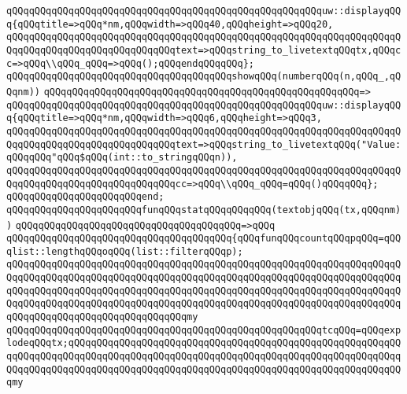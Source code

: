 \verb|qQQqqQQqqQQqqQQqqQQqqQQqqQQqqQQqqQQqqQQqqQQqqQQqqQQqqQQquw::displayqQQq{qQQqtitle=>qQQq*nm,qQQqwidth=>qQQq40,qQQqheight=>qQQq20,|\newline
\verb|qQQqqQQqqQQqqQQqqQQqqQQqqQQqqQQqqQQqqQQqqQQqqQQqqQQqqQQqqQQqqQQqqQQqqQQqqQQqqQQqqQQqqQQqqQQqqQQqqQQqtext=>qQQqstring_to_livetextqQQqtx,qQQqcc=>qQQq\\qQQq_qQQq=>qQQq();qQQqendqQQqqQQq};|\newline
\newline
\verb|qQQqqQQqqQQqqQQqqQQqqQQqqQQqqQQqqQQqqQQqshowqQQq(numberqQQq(n,qQQq_,qQQqnm))|\newline
\verb|qQQqqQQqqQQqqQQqqQQqqQQqqQQqqQQqqQQqqQQqqQQqqQQqqQQqqQQq=>|\newline
\verb|qQQqqQQqqQQqqQQqqQQqqQQqqQQqqQQqqQQqqQQqqQQqqQQqqQQqqQQquw::displayqQQq{qQQqtitle=>qQQq*nm,qQQqwidth=>qQQq6,qQQqheight=>qQQq3,|\newline
\verb|qQQqqQQqqQQqqQQqqQQqqQQqqQQqqQQqqQQqqQQqqQQqqQQqqQQqqQQqqQQqqQQqqQQqqQQqqQQqqQQqqQQqqQQqqQQqqQQqqQQqtext=>qQQqstring_to_livetextqQQq("Value:qQQqqQQq"qQQq$qQQq(int::to_stringqQQqn)),|\newline
\verb|qQQqqQQqqQQqqQQqqQQqqQQqqQQqqQQqqQQqqQQqqQQqqQQqqQQqqQQqqQQqqQQqqQQqqQQqqQQqqQQqqQQqqQQqqQQqqQQqqQQqcc=>qQQq\\qQQq_qQQq=qQQq()qQQqqQQq};|\newline
\verb|qQQqqQQqqQQqqQQqqQQqqQQqend;|\newline
\newline
\verb|qQQqqQQqqQQqqQQqqQQqqQQqfunqQQqstatqQQqqQQqqQQq(textobjqQQq(tx,qQQqnm))|\newline
\verb|qQQqqQQqqQQqqQQqqQQqqQQqqQQqqQQqqQQqqQQq=>qQQq|\newline
\verb|qQQqqQQqqQQqqQQqqQQqqQQqqQQqqQQqqQQqqQQq{qQQqfunqQQqcountqQQqpqQQq=qQQqlist::lengthqQQqoqQQq(list::filterqQQqp);|\newline
\verb|qQQqqQQqqQQqqQQqqQQqqQQqqQQqqQQqqQQqqQQqqQQqqQQqqQQqqQQqqQQqqQQqqQQqqQQqqQQqqQQqqQQqqQQqqQQqqQQqqQQqqQQqqQQqqQQqqQQqqQQqqQQqqQQqqQQqqQQqqQQqqQQqqQQqqQQqqQQqqQQqqQQqqQQqqQQqqQQqqQQqqQQqqQQqqQQqqQQqqQQqqQQqqQQqqQQqqQQqqQQqqQQqqQQqqQQqqQQqqQQqqQQqqQQqqQQqqQQqqQQqqQQqqQQqqQQqqQQqqQQqqQQqqQQqqQQqqQQqqQQqqQQqqQQqqQQqmy|\newline
\verb|qQQqqQQqqQQqqQQqqQQqqQQqqQQqqQQqqQQqqQQqqQQqqQQqqQQqqQQqtcqQQq=qQQqexplodeqQQqtx;qQQqqQQqqQQqqQQqqQQqqQQqqQQqqQQqqQQqqQQqqQQqqQQqqQQqqQQqqQQqqQQqqQQqqQQqqQQqqQQqqQQqqQQqqQQqqQQqqQQqqQQqqQQqqQQqqQQqqQQqqQQqqQQqqQQqqQQqqQQqqQQqqQQqqQQqqQQqqQQqqQQqqQQqqQQqqQQqqQQqqQQqqQQqqQQqqQQqqQQqmy|\newline
